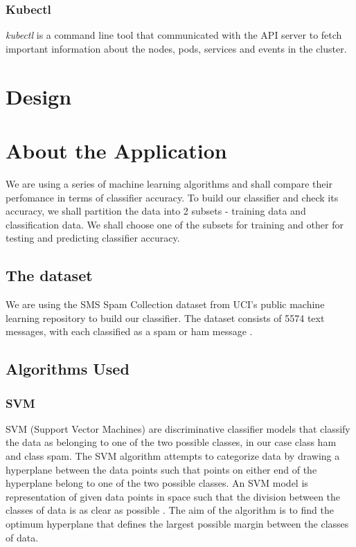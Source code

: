 \documentclass[9pt,twocolumn,twoside]{../../styles/osajnl}
\begin{document}
\subsubsection{Kubectl}
\emph{kubectl} is a command line tool that communicated with the API
server to fetch important information about the nodes, pods, services
and events in the cluster.


\section{Design}

\section{About the Application}
We are using a series of machine learning algorithms and shall compare
their perfomance in terms of classifier accuracy. To build our
classifier and check its accuracy, we shall partition the data into 2
subsets - training data and classification data. We shall choose one
of the subsets for training and other for testing and predicting
classifier accuracy.

\subsection{The dataset}
We are using the SMS Spam Collection dataset from UCI's
public machine learning repository to build our classifier. The
dataset consists of 5574 text messages, with each classified as a spam
or ham message \cite{www-sms_spam_collection}.

\subsection{Algorithms Used}

\subsubsection{SVM}
SVM (Support Vector Machines) are discriminative classifier models
that classify the data as belonging to one of the two possible
classes, in our case class ham and class spam. The SVM algorithm
attempts to categorize data by drawing a hyperplane between the data
points such that points on either end of the hyperplane belong to one
of the two possible classes. An SVM model is representation of given
data points in space such that the division between the classes of
data is as clear as possible \cite{www-svm-wiki}. The aim of the algorithm
is to find the optimum hyperplane that defines the largest possible
margin between the classes of data.
\end{document}
